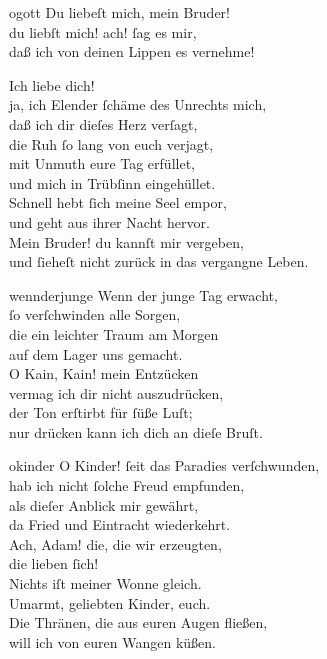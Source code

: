 \documentclass[tocstyle=ref-genre]{ees}
\begin{document}
{\begin{movement}{ogott}
  \voice[Abel]
  Du liebeſt mich, mein Bruder!\\
  du liebſt mich! ach! ſag es mir,\\
  daß ich von deinen Lippen es vernehme!

  \voice[Kain]
  Ich liebe dich!\\
  ja, ich Elender ſchäme des Unrechts mich,\\
  daß ich dir dieſes Herz verſagt,\\
  die Ruh ſo lang von euch verjagt,\\
  mit Unmuth eure Tag erfüllet,\\
  und mich in Trübſinn eingehüllet.\\
  Schnell hebt ſich meine Seel empor,\\
  und geht aus ihrer Nacht hervor.\\
  Mein Bruder! du kannſt mir vergeben,\\
  und ſieheſt nicht zurück in das vergangne Leben.
\end{movement}

\begin{movement}{wennderjunge}
  \voice[Abel]
  Wenn der junge Tag erwacht,\\
  ſo verſchwinden alle Sorgen,\\
  die ein leichter Traum am Morgen\\
  auf dem Lager uns gemacht.\\
  O Kain, Kain! mein Entzücken\\
  vermag ich dir nicht auszudrücken,\\
  der Ton erſtirbt für ſüße Luſt;\\
  nur drücken kann ich dich an dieſe Bruſt.
\end{movement}

\begin{movement}{okinder}
  \voice[Eva]
  O Kinder! ſeit das Paradies verſchwunden,\\
  hab ich nicht ſolche Freud empfunden,\\
  als dieſer Anblick mir gewährt,\\
  da Fried und Eintracht wiederkehrt.\\
  Ach, Adam! die, die wir erzeugten,\\
  die lieben ſich!\\
  Nichts iſt meiner Wonne gleich.\\
  Umarmt, geliebten Kinder, euch.\\
  Die Thränen, die aus euren Augen fließen,\\
  will ich von euren Wangen küßen.
\end{movement}

}
\end{document}

